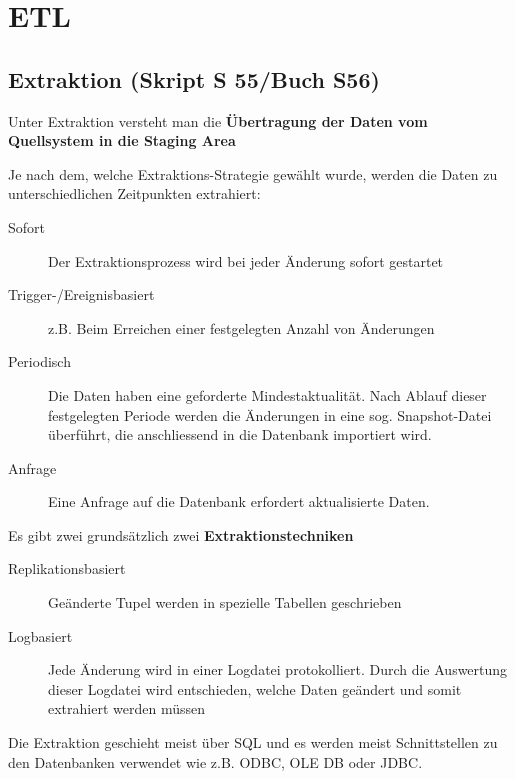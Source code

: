 \documentclass[a4paper, 11pt, nofootinbib]{article}
\begin{document}
\newpage

\section{ETL}
\subsection{Extraktion (Skript S 55/Buch S56)}

Unter Extraktion versteht man die \textbf{Übertragung der Daten vom Quellsystem in die Staging Area}

\vspace{10px}

\noindent Je nach dem, welche Extraktions-Strategie gewählt wurde, werden die Daten zu unterschiedlichen Zeitpunkten extrahiert:

\begin{description}
	\item[Sofort] Der Extraktionsprozess wird bei jeder Änderung sofort gestartet
	\item[Trigger-/Ereignisbasiert] z.B. Beim Erreichen einer festgelegten Anzahl von Änderungen
	\item[Periodisch] Die Daten haben eine geforderte Mindestaktualität. Nach Ablauf dieser festgelegten Periode werden die Änderungen in eine sog. Snapshot-Datei überführt, die anschliessend in die Datenbank importiert wird.
	\item[Anfrage] Eine Anfrage auf die Datenbank erfordert aktualisierte Daten.
\end{description}

\vspace{10px}

\noindent Es gibt zwei grundsätzlich zwei \textbf{Extraktionstechniken}
\begin{description}
	\item[Replikationsbasiert] Geänderte Tupel werden in spezielle Tabellen geschrieben
	\item[Logbasiert] Jede Änderung wird in einer Logdatei protokolliert. Durch die Auswertung dieser Logdatei wird entschieden, welche Daten geändert und somit extrahiert werden müssen
\end{description}

\noindent Die Extraktion geschieht meist über SQL und es werden meist Schnittstellen zu den Datenbanken verwendet wie z.B. ODBC, OLE DB oder JDBC.

\vspace{10px}
\end{document}
